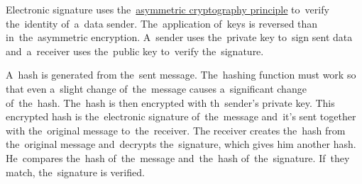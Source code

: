 \label{electronicsignature}
Electronic signature uses the~\hyperref[asymmetriccryptography]{asymmetric cryptography principle} to~verify the~identity of~a~data sender.
The~application of~keys is reversed than in~the~asymmetric encryption.
A~sender uses the~private key to~sign sent data and~a~receiver uses the~public key to~verify the~signature.

A~hash is generated from the~sent message.
The~hashing function must work so that even a~slight change of~the~message causes a~significant change of~the~hash.
The~hash is then encrypted with th~sender's private key.
This encrypted hash is the~electronic signature of~the~message and~it's sent together with the~original message to~the~receiver.
The receiver creates the~hash from the~original message and~decrypts the~signature, which gives him another hash.
He~compares the~hash of~the~message and~the~hash of~the~signature.
If~they match, the~signature is verified.
